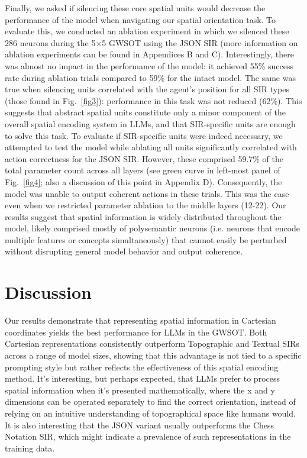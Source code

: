 \documentclass[runningheads]{llncs}
\begin{document}
Finally, we asked if silencing these core spatial units would decrease the performance of the model when navigating our spatial orientation task. To evaluate this, we conducted an ablation experiment in which we silenced these 286 neurons during the 5×5 GWSOT using the JSON SIR (more information on ablation experiments can be found in Appendices B and C). Interestingly, there was almost no impact in the performance of the model: it achieved 55\% success rate during ablation trials compared to 59\% for the intact model. The same was true when silencing units correlated with the agent’s position for all SIR types (those found in Fig.~\ref{fig3}): performance in this task was not reduced (62\%). This suggests that abstract spatial units constitute only a minor component of the overall spatial encoding system in LLMs, and that SIR-specific units are enough to solve this task. To evaluate if SIR-specific units were indeed necessary, we attempted to test the model while ablating all units significantly correlated with action correctness for the JSON SIR. However, these comprised 59.7\% of the total parameter count across all layers (see green curve in left-most panel of Fig.~\ref{fig4}; also a discussion of this point in Appendix D). Consequently, the model was unable to output coherent actions in these trials. This was the case even when we restricted parameter ablation to the middle layers (12-22). Our results suggest that spatial information is widely distributed throughout the model, likely comprised mostly of polysemantic neurons (i.e. neurons that encode multiple features or concepts simultaneously) that cannot easily be perturbed without disrupting general model behavior and output coherence.


\section{Discussion}

Our results demonstrate that representing spatial information in Cartesian coordinates yields the best performance for LLMs in the GWSOT. Both Cartesian representations consistently outperform Topographic and Textual SIRs across a range of model sizes, showing that this advantage is not tied to a specific prompting style but rather reflects the effectiveness of this spatial encoding method. It’s interesting, but perhaps expected, that LLMs prefer to process spatial information when it’s presented mathematically, where the x and y dimensions can be operated separately to find the correct orientation, instead of relying on an intuitive understanding of topographical space like humans would. It is also interesting that the JSON variant usually outperforms the Chess Notation SIR, which might indicate a prevalence of such representations in the training data.
\end{document}
